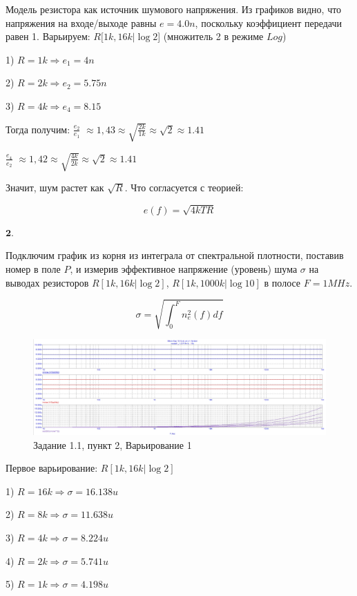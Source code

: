 \documentclass[a4paper, 14pt]{extarticle}%
\begin{document}
Модель резистора как источник шумового напряжения.
Из графиков видно, что напряжения на входе/выходе равны $e = 4.0n$, поскольку коэффициент передачи равен 1.
Варьируем: $R[1k, 16k | \log2$] (множитель 2 в режиме $Log$)


1) $R = 1k \Rightarrow e_1 = 4n$


2) $R = 2k \Rightarrow e_2 = 5.75n$

3) $R = 4k \Rightarrow e_4 = 8.15$


Тогда получим:
$\frac{e_2}{e_1}$ $\approx 1,43 \approx \sqrt{\frac{2k}{1k}} \approx \sqrt{2} \approx 1.41$

$\frac{e_4}{e_2}$ $\approx 1,42 \approx \sqrt{\frac{4k}{2k}} \approx \sqrt{2} \approx 1.41$

Значит, шум растет как $\sqrt{R}$. Что согласуется с теорией:

\[ e(f) = \sqrt{4kTR} \]

$\textbf{2.}$

Подключим график из корня из интеграла от спектральной плотности, поставив номер в поле $P$, и измерив эффективное напряжение (уровень) шума $\sigma$ на выводах резисторов $R[1k, 16k | \log2]$, $R[1k, 1000k | \log10]$ в полосе $F = 1 MHz$.


\[ \sigma = \sqrt{\int_0^F n_e^{2}(f)df} \]

\begin{figure}[h!]
			\centering
			\includegraphics[width=1.1\linewidth]{pic1.jpg}
			\caption{Задание 1.1, пункт 2, Варьирование 1}
			\label{A}
\end{figure}

Первое варьирование: $R[1k, 16k | \log2]$

1) $R = 16k \Rightarrow \sigma = 16.138u$

2) $R = 8k \Rightarrow \sigma = 11.638u$

3) $R = 4k \Rightarrow \sigma = 8.224u$

4) $R = 2k \Rightarrow \sigma = 5.741u$

5) $R = 1k \Rightarrow \sigma = 4.198u$
\end{document}
